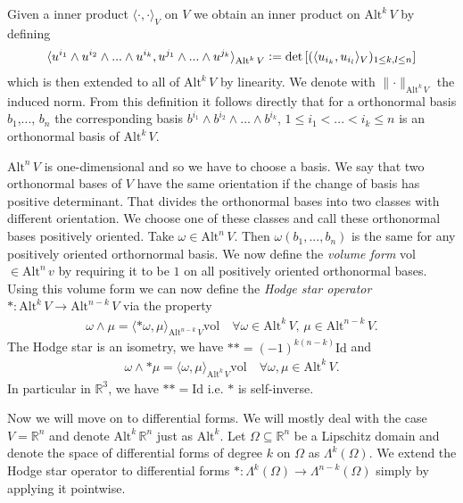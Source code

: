 \documentclass[12pt,a4paper]{article}
\theoremstyle{definition}
\newcommand{\alternating}[2]{ {\text{Alt}^{#1}\,#2} }
\newcommand{\real}{\mathbb{R}}
\begin{document}
Given a inner product $\langle\cdot, \cdot \rangle_V$ on $V$ we obtain an inner 
product on $\alternating{k}{V}$ by defining
\begin{align*}
    \langle u^{i_1} \wedge u^{i_2} \wedge... \wedge u^{i_k}, 
    u^{j_1} \wedge... \wedge u^{j_k} \rangle_{\alternating{k}{V}} 
    \vcentcolon= \det \left[ ( \langle u_{i_k}, u_{i_l} \rangle_V )_
    {1\leq k,l \leq n} \right] 
\end{align*}
which is then extended to all of $\alternating{k}{V}$ by linearity. 
We denote with $\lVert \cdot \rVert _\alternating{k}{V}$ the induced norm.
From this definition it follows directly that for a orthonormal basis 
$b_1$,..., $b_n$ the corresponding basis 
$b^{i_1} \wedge b^{i_2} \wedge ... \wedge b^{i_k}$, 
$1\leq i_1 < ... < i_k \leq n$ is an orthonormal basis of $\alternating{k}{V}$.


$\alternating{n}{V}$ is one-dimensional and so we have to choose a basis.
We say that two orthonormal bases of $V$ 
have the same orientation if the change of basis has positive determinant. 
That divides the orthonormal bases into two classes with different orientation.
We choose one of these classes and call these orthonormal bases positively
oriented. Take $\omega \in \alternating{n}{V}$. Then 
$\omega(b_1,...,b_n)$ is the same for any positively oriented orthornormal
basis. We now define the \textit{volume form} vol $\in \alternating{n}{v}$ by requiring
it to be $1$ on all positively oriented orthonormal bases. Using this volume 
form we can now define the \textit{Hodge star operator} 
$*: \alternating{k}{V} \rightarrow \alternating{n-k}{V}$ via the property 
\begin{align*}
    \omega \wedge \mu = \langle *\omega, \mu \rangle_{\alternating{n-k}{V}} 
    \text{vol}
    \quad \forall \omega \in \alternating{k}{V} , \, 
    \mu \in \alternating{n-k}{V}.
\end{align*}
The Hodge star is an isometry, we have $** = (-1)^{k(n-k)}\text{Id}$ and 
\begin{align*}
    \omega \wedge *\mu = \langle \omega, \mu \rangle_{\alternating{k}{V}} 
    \text{vol} \quad \forall \omega, \mu \in \alternating{k}{V}.
\end{align*}
In particular in $\real^3$, we have $** = \text{Id}$ i.e. $*$ is self-inverse.


Now we will move on to differential forms. We will mostly deal with the
case $V = \real^n$ and denote $\text{Alt}^k\,\real^n$ just as $\text{Alt}^k$.
Let $\Omega \subseteq \real^n$ be a Lipschitz domain and denote the space 
of differential forms of degree $k$ on $\Omega$ as $\Lambda^k(\Omega)$.
We extend the Hodge star operator to differential forms 
$*: \Lambda^k(\Omega) \rightarrow \Lambda^{n-k}(\Omega)$ simply by applying it 
pointwise.
\end{document}
